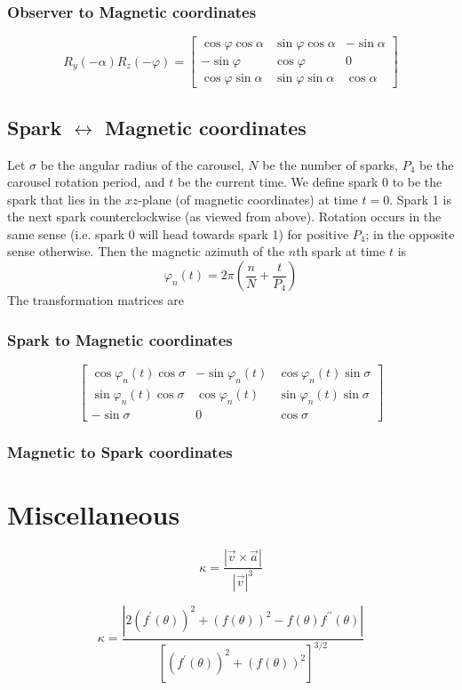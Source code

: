 \documentclass[twocolumn]{article}
\newcommand{\phase}{\varphi}
\begin{document}
\subsubsection*{Observer to Magnetic coordinates}
\begin{equation}
    R_y(-\alpha) R_z(-\phase) =
    \begin{bmatrix}
        \cos\phase\cos\alpha & \sin\phase\cos\alpha & -\sin\alpha \\
        -\sin\phase          & \cos\phase           & 0           \\
        \cos\phase\sin\alpha & \sin\phase\sin\alpha &  \cos\alpha
    \end{bmatrix}
\end{equation}

\subsection{Spark $\leftrightarrow$ Magnetic coordinates}
Let $\sigma$ be the angular radius of the carousel, $N$ be the number of sparks, $P_4$ be the carousel rotation period, and $t$ be the current time.
We define spark $0$ to be the spark that lies in the $xz$-plane (of magnetic coordinates) at time $t=0$.
Spark 1 is the next spark counterclockwise (as viewed from above).
Rotation occurs in the same sense (i.e. spark 0 will head towards spark 1) for positive $P_4$; in the opposite sense otherwise.
Then the magnetic azimuth of the $n$th spark at time $t$ is
\begin{equation}
    \phase_n(t) = 2\pi\left(\frac{n}{N} + \frac{t}{P_4}\right)
\end{equation}
The transformation matrices are

\subsubsection*{Spark to Magnetic coordinates}
\begin{equation}
    \begin{bmatrix}
        \cos\phase_n(t)\cos\sigma & -\sin\phase_n(t) & \cos\phase_n(t)\sin\sigma \\
        \sin\phase_n(t)\cos\sigma &  \cos\phase_n(t) & \sin\phase_n(t)\sin\sigma \\
        -\sin\sigma          & 0           & \cos\sigma
    \end{bmatrix}
\end{equation}

\subsubsection*{Magnetic to Spark coordinates}

\section{Miscellaneous}

\begin{equation}
    \kappa = \frac{|\vec{v}\times\vec{a}|}{|\vec{v}|^3}
\end{equation}

\begin{equation}
    \kappa = \frac{|2(f^\prime(\theta))^2 + (f(\theta))^2 - f(\theta)f^{\prime\prime}(\theta)|}{\left[(f^\prime(\theta))^2 + (f(\theta))^2\right]^{3/2}}
\end{equation}
\end{document}
